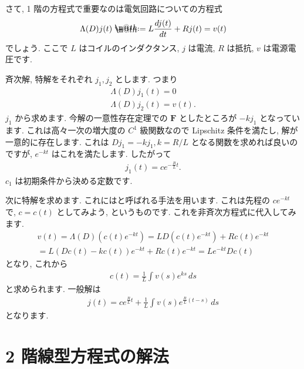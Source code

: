 \documentclass[openany, a4paper, oneside]{jsbook}
\makeatletter
\newcommand*{\defeq}{\mathrel{\rlap{%
\raisebox{0.3ex}{$\m@th\cdot$}}%
\raisebox{-0.3ex}{$\m@th\cdot$}}%
=}
\theoremstyle{break}
\theoremstyle{breakdefn}
\makeatother
\begin{document}
さて, 1 階の方程式で重要なのは電気回路についての方程式
\begin{gather}
\Lambda (D) j (t)
\defeq
L \frac{d j (t)} {dt} + R j (t)
=
v (t)
\end{gather}
でしょう.
ここで $L$ はコイルのインダクタンス,  $j$ は電流,
$R$ は抵抗,  $v$ は電源電圧です.

斉次解, 特解をそれぞれ $j_1,j_2$ とします.
つまり
\begin{gather}
\Lambda (D) j_1 (t) = 0 \\
\Lambda (D) j_2 (t) = v (t) .
\end{gather}
$j_1$ から求めます.
今解の一意性存在定理での $\bm{F}$ としたところが $-k j_1$ となっています.
これは高々一次の増大度の $C^1$ 級関数なので Lipschitz 条件を満たし, 解が一意的に存在します.
これは $D j_1 = - k j_1,k=R/L$ となる関数を求めれば良いのですが,  $e^{-kt}$ はこれを満たします.
したがって
\begin{gather}
j_1 (t)
=
c e^{- \frac{R} {L} t } .
\end{gather}
$c_1$ は初期条件から決める定数です.

次に特解を求めます.
これにはと呼ばれる手法を用います.
これは先程の $ce^{-kt}$ で,  $c=c (t)$ としてみよう, というものです.
これを非斉次方程式に代入してみます.
\begin{gather}
v (t)
=
\Lambda (D) \left ( c (t) e^{-kt} \right)
=
L D \left ( c (t) e^{-kt} \right) + R c (t) e^{-kt} \\
=
L \left ( Dc (t) - k c (t) \right) e^{-kt}  + R c (t) e^{-kt}
=
L e^{-kt} D c (t)
\end{gather}
となり, これから
\begin{gather}
c (t)
=
\frac{1} {L} \int v (s) e^{ks} \, ds
\end{gather}
と求められます.
一般解は
\begin{gather}
j (t)
=
c e^{\frac{R} {L} t} + \frac{1} {L} \int v (s) e^{\frac{R} {L}(t-s)} \, ds
\end{gather}
となります.
\section{2 階線型方程式の解法}
\end{document}
